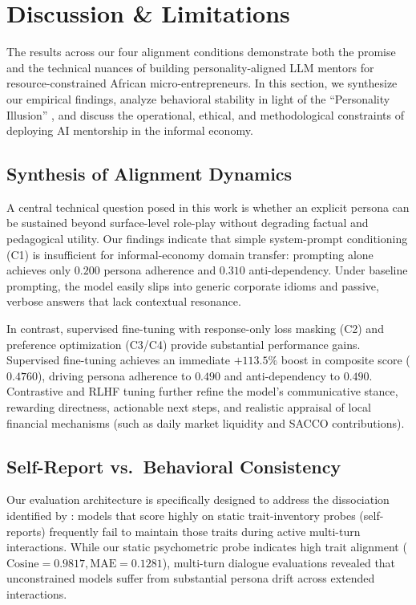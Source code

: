 \section{Discussion \& Limitations}
\label{sec:discussion}

The results across our four alignment conditions demonstrate both the promise and the technical nuances of building personality-aligned LLM mentors for resource-constrained African micro-entrepreneurs. In this section, we synthesize our empirical findings, analyze behavioral stability in light of the ``Personality Illusion'' \citep{han2025illusion}, and discuss the operational, ethical, and methodological constraints of deploying AI mentorship in the informal economy.

\subsection{Synthesis of Alignment Dynamics}
\label{subsec:discussion-synthesis}

A central technical question posed in this work is whether an explicit persona can be sustained beyond surface-level role-play without degrading factual and pedagogical utility. Our findings indicate that simple system-prompt conditioning (C1) is insufficient for informal-economy domain transfer: prompting alone achieves only $0.200$ persona adherence and $0.310$ anti-dependency. Under baseline prompting, the model easily slips into generic corporate idioms and passive, verbose answers that lack contextual resonance.

In contrast, supervised fine-tuning with response-only loss masking (C2) and preference optimization (C3/C4) provide substantial performance gains. Supervised fine-tuning achieves an immediate $+113.5\%$ boost in composite score ($0.4760$), driving persona adherence to $0.490$ and anti-dependency to $0.490$. Contrastive and RLHF tuning further refine the model's communicative stance, rewarding directness, actionable next steps, and realistic appraisal of local financial mechanisms (such as daily market liquidity and SACCO contributions).

\subsection{Self-Report vs.\ Behavioral Consistency}
\label{subsec:discussion-consistency}

Our evaluation architecture is specifically designed to address the dissociation identified by \citet{han2025illusion}: models that score highly on static trait-inventory probes (self-reports) frequently fail to maintain those traits during active multi-turn interactions. While our static psychometric probe indicates high trait alignment ($\text{Cosine} = 0.9817, \text{MAE} = 0.1281$), multi-turn dialogue evaluations revealed that unconstrained models suffer from substantial persona drift across extended interactions.

